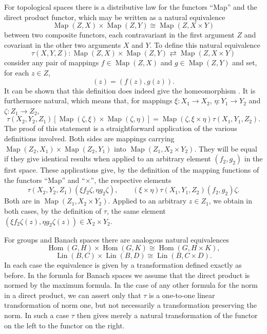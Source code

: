 \documentclass[11pt,a4paper]{report}
\DeclareMathOperator{\map}{Map}
\DeclareMathOperator{\hm}{Hom}
\DeclareMathOperator{\lin}{Lin}
\begin{document}
For topological spaces there is a distributive law for the functors ``Map'' and the direct product functor,
which may be written as a natural equivalence
\begin{equation}\label{eq:top_eq}
	\map(Z,X)\times\map(Z,Y)\cong\map(Z,X\times Y)
\end{equation}
between two composite functors, each contravariant in the first argument $Z$ and covariant in the other two
arguments $X$ and $Y$. To define this natural equivalence
\begin{equation*}
	\tau(X,Y,Z): \map(Z,X)\times\map(Z,Y)\rightleftarrows \map(Z,X\times Y)
\end{equation*}
consider any pair of mappings $f\in\map(Z,X)$ and $g\in\map(Z,Y)$ and set, for each $z\in Z$,
\begin{equation*}
	[\tau(f,g)](z) = (f(z),g(z)).
\end{equation*}
It can be shown that this definition does indeed give the homeomorphism . It is furthermore
natural, which means that, for mappings $\xi:X_1\rightarrow X_2$, $\eta:Y_1\rightarrow Y_2$ and $\zeta:Z_1
\rightarrow Z_2$,
\begin{equation*}
	\tau(X_2,Y_2,Z_1)[\map(\zeta,\xi)\times\map(\zeta,\eta)]=\map(\zeta,\xi\times\eta)\tau(X_1,Y_1,Z_2).
\end{equation*}
The proof of this statement is a straightforward application of the various definitions involved. Both sides
are mappings carrying $\map(Z_2,X_1)\times\map(Z_2,Y_1)$ into $\map(Z_1,X_2\times Y_2)$. They will be equal
if they give identical results when applied to an arbitrary element $(f_2,g_2)$ in the first space.
These applications give, by the definition of the mapping functions of the functors ``Map'' and ``$\times$'',
the respective elements
\begin{equation*}
	\tau(X_2,Y_2,Z_1)(\xi f_2\zeta, \eta g_2\zeta), \qquad (\xi\times\eta)\tau(X_1,Y_1,Z_2)(f_2,g_2)\zeta.
\end{equation*}
Both are in $\map(Z_1,X_2\times Y_2)$. Applied to an arbitrary $z\in Z_1$, we obtain in both cases, by the
definition of $\tau$, the same element $(\xi f_2\zeta(z), \eta g_2\zeta(z))\in X_2\times Y_2$.

For groups and Banach spaces there are analogous natural equivalences
\begin{equation}\label{eq:grp_eq}
	\hm(G,H)\times\hm(G,K)\cong\hm(G,H\times K),
\end{equation}
\begin{equation}\label{eq:ban_eq}
	\lin(B,C)\times\lin(B,D)\cong\lin(B,C\times D).
\end{equation}
In each case the equivalence is given by a transformation defined exactly as before. In the formula for Banach
spaces we assume that the direct product is normed by the maximum formula. In the case of any other formula for
the norm in a direct product, we can assert only that $\tau$ is a one\hyp{}to\hyp{}one linear transformation of
norm one, but not necessarily a transformation preserving the norm. In such a case $\tau$ then gives merely a
natural transformation of the functor on the left to the functor on the right.
\end{document}
